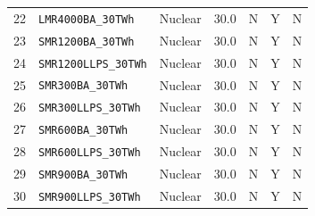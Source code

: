 \begin{landscape}
\begin{table}[htbp]
\begin{tabular}{lp{8cm}lcccc}
22 & \texttt{LMR4000BA\_30TWh} & Nuclear & 30.0 & N & Y & N \\
23 & \texttt{SMR1200BA\_30TWh} & Nuclear & 30.0 & N & Y & N \\
24 & \texttt{SMR1200LLPS\_30TWh} & Nuclear & 30.0 & N & Y & N \\
25 & \texttt{SMR300BA\_30TWh} & Nuclear & 30.0 & N & Y & N \\
26 & \texttt{SMR300LLPS\_30TWh} & Nuclear & 30.0 & N & Y & N \\
27 & \texttt{SMR600BA\_30TWh} & Nuclear & 30.0 & N & Y & N \\
28 & \texttt{SMR600LLPS\_30TWh} & Nuclear & 30.0 & N & Y & N \\
29 & \texttt{SMR900BA\_30TWh} & Nuclear & 30.0 & N & Y & N \\
30 & \texttt{SMR900LLPS\_30TWh} & Nuclear & 30.0 & N & Y & N \\
\hline
\end{tabular}
\end{table}
\end{landscape}